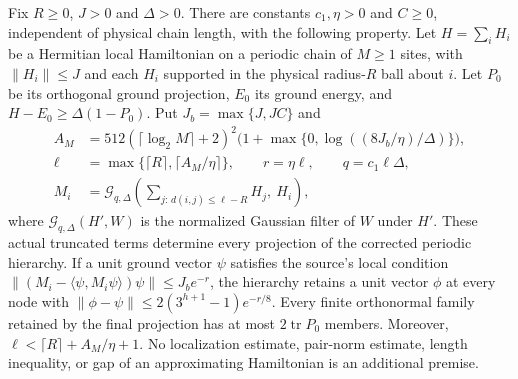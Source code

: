 \begin{lemma}
    \label{thm:hastings_periodic_physical_hierarchy}
    \leanok
    Fix $R\ge0$, $J>0$ and $\Delta>0$. There are constants $c_1,\eta>0$
    and $C\ge0$, independent of physical chain length, with the following
    property. Let $H=\sum_iH_i$ be a Hermitian local Hamiltonian on a
    periodic chain of $M\ge1$ sites, with $\|H_i\|\le J$ and each $H_i$
    supported in the physical radius-$R$ ball about $i$. Let $P_0$ be
    its orthogonal ground projection, $E_0$ its ground energy, and
    $H-E_0\ge\Delta(1-P_0)$.
    Put $J_b=\max\{J,JC\}$ and
    \begin{align*}
        A_M  & =512(\lceil\log_2M\rceil+2)^2
        \bigl(1+\max\{0,\log((8J_b/\eta)/\Delta)\}\bigr),     \\
        \ell & =\max\{\lceil R\rceil,\lceil A_M/\eta\rceil\},
        \qquad r=\eta\ell,\qquad q=c_1\ell\Delta,             \\
        M_i  & =\mathcal G_{q,\Delta}
        \left(\sum_{j:\,d(i,j)\le\ell-R}H_j,\ H_i\right),
    \end{align*}
    where $\mathcal G_{q,\Delta}(H',W)$ is the normalized Gaussian
    filter of $W$ under $H'$.
    These actual truncated terms determine every projection of the
    corrected periodic hierarchy. If a unit ground vector $\psi$
    satisfies the source's local condition
    $\|(M_i-\langle\psi,M_i\psi\rangle)\psi\|\le J_b e^{-r}$,
    the hierarchy retains a unit vector $\phi$ at every node with
    $\|\phi-\psi\|\le2(3^{h+1}-1)e^{-r/8}$.
    Every finite orthonormal family retained by the final projection
    has at most $2\operatorname{tr}P_0$ members. Moreover,
    $\ell<\lceil R\rceil+A_M/\eta+1$.
    No localization estimate, pair-norm estimate, length inequality,
    or gap of an approximating Hamiltonian is an additional premise.
\end{lemma}

